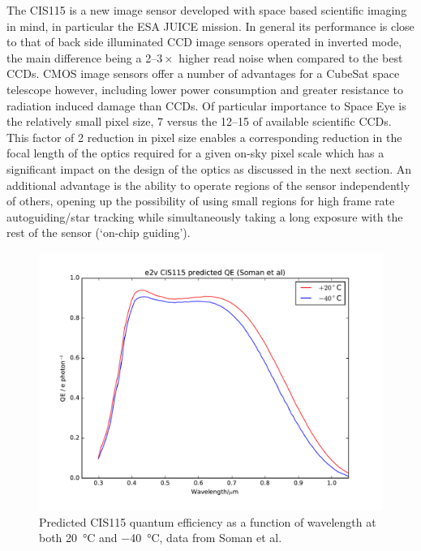 \documentclass[]{iac}
\begin{document}
The CIS115 is a new image sensor developed with space based scientific imaging in mind, in particular the ESA JUICE
mission. In general its performance is close to that of back side illuminated CCD image sensors operated in inverted
mode, the main difference being a 2--$3\times$ higher read noise when compared to the best CCDs. CMOS image sensors
offer a number of advantages for a CubeSat space telescope however, including lower power consumption and greater
resistance to radiation induced damage than CCDs. Of particular importance to Space Eye is the relatively small pixel
size, \SI{7}{\micron} versus the 12--\SI{15}{\micron} of available scientific CCDs. This factor of 2 reduction in pixel
size enables a corresponding reduction in the focal length of the optics required for a given on-sky pixel scale which
has a significant impact on the design of the optics as discussed in the next section. An additional advantage is the
ability to operate regions of the sensor independently of others, opening up the possibility of using small regions for
high frame rate autoguiding/star tracking while simultaneously taking a long exposure with the rest of the sensor
(`on-chip guiding').

\begin{figure}[htp]
  \center
  \includegraphics[width=\columnwidth]{figures/CIS115QE.pdf}
  \caption{\label{fig:qe}Predicted CIS115 quantum efficiency as a function of wavelength at both \SI{+20}{\celsius} and
    \SI{-40}{\celsius}, data from Soman et al.\cite{Soman2014}}
\end{figure}
\end{document}
